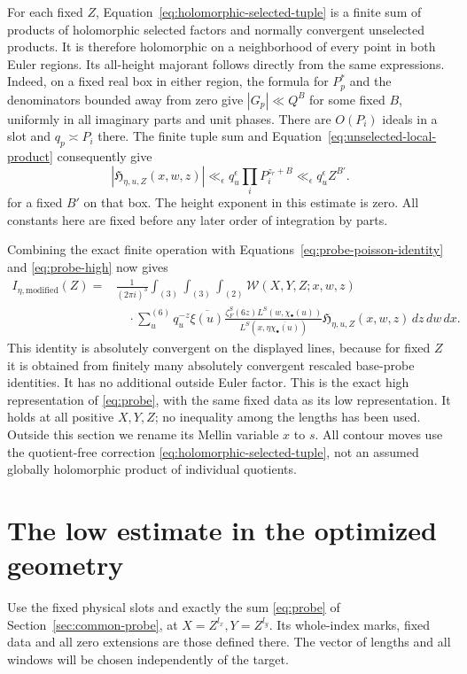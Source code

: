 \documentclass[12pt]{article}
\begin{document}
For each fixed $Z$, Equation~\eqref{eq:holomorphic-selected-tuple} is a
finite sum of products of holomorphic selected factors and normally
convergent unselected products.  It is therefore holomorphic on a
neighborhood of every point in both Euler regions.  Its all-height majorant follows directly from the same expressions.
Indeed, on a fixed real box in either region, the formula for $P_p^*$ and
the denominators bounded away from zero give $|G_p|\ll Q^B$ for some
fixed $B$, uniformly in all imaginary parts and unit phases.  There are
$O(P_i)$ ideals in a slot and $q_p\asymp P_i$ there.  The finite tuple
sum and Equation~\eqref{eq:unselected-local-product} consequently give
\begin{equation}\label{eq:compensated-all-height-majorant}
 |\mathfrak H_{\eta,u,Z}(x,w,z)|
 \ll_\epsilon q_u^\epsilon\prod_iP_i^{z_r+B}
 \ll_\epsilon q_u^\epsilon Z^{B'}.
\end{equation}
for a fixed $B'$ on that box.  The height exponent in this estimate is zero.  All constants here
are fixed before any later order of integration by parts.

Combining the exact finite operation with
Equations~\eqref{eq:probe-poisson-identity} and \eqref{eq:probe-high}
now gives
\begin{equation}\label{eq:compensated-poisson-identity}
\begin{split}
 I_{\eta,\mathrm{modified}}(Z)
 ={}&\frac1{(2\pi i)^3}\int_{(3)}\int_{(3)}\int_{(2)}
       \mathcal W(X,Y,Z;x,w,z)\\
 &\quad\cdot\sum_u^{(6)}q_u^{-z}\overline{\xi(u)}
       \frac{\zeta_F^S(6z)L^S(w,\chi_\bullet(u))}
       {L^S(x,\eta\overline{\chi_\bullet(u)})}
       \mathfrak H_{\eta,u,Z}(x,w,z)\,dz\,dw\,dx.
\end{split}
\end{equation}
This identity is absolutely convergent on the displayed lines, because for
fixed $Z$ it is obtained from finitely many absolutely convergent rescaled
base-probe identities.  It has no additional outside Euler factor.
This is the exact high representation of \eqref{eq:probe}, with
the same fixed data as its low representation.  It holds at all
positive \(X,Y,Z\); no inequality among the lengths has been used.
Outside this section we rename its Mellin variable \(x\) to \(s\).
All contour moves use the quotient-free correction
\eqref{eq:holomorphic-selected-tuple}, not an assumed globally
holomorphic product of individual quotients.

\section{The low estimate in the optimized geometry}\label{sec:low}
Use the fixed physical slots and exactly the sum \eqref{eq:probe}
of Section~\ref{sec:common-probe}, at \(X=Z^{l_x},Y=Z^{l_y}\).
Its whole-index marks, fixed data and all zero extensions are
those defined there.  The vector of lengths and all windows will
be chosen independently of the target.
\end{document}
